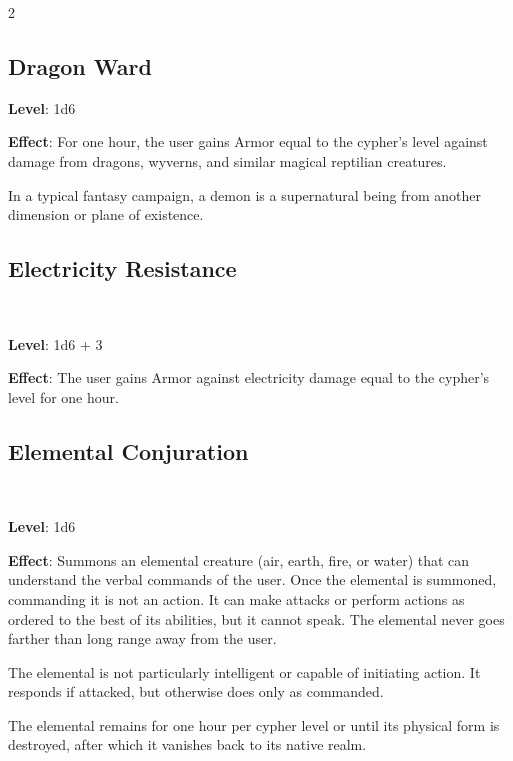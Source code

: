 \begin{multicols}{2}
\subsection{Dragon Ward}

\textbf{Level}: 1d6 

\textbf{Effect}: For one hour, the user gains Armor equal to the cypher’s level against damage from dragons, wyverns, and similar magical reptilian creatures.

In a typical fantasy campaign, a demon is a supernatural being from another dimension or plane of existence.

\subsection{Electricity Resistance} 

\textbf{Level}: 1d6 + 3 

\textbf{Effect}: The user gains Armor against electricity damage equal to the cypher’s level for one hour. 

\subsection{Elemental Conjuration}

\textbf{Level}: 1d6 

\textbf{Effect}: Summons an elemental creature (air, earth, fire, or water) that can understand the verbal commands of the user. Once the elemental is summoned, commanding it is not an action. It can make attacks or perform actions as ordered to the best of its abilities, but it cannot speak. The elemental never goes farther than long range away from the user. 

The elemental is not particularly intelligent or capable of initiating action. It responds if attacked, but otherwise does only as commanded. 

The elemental remains for one hour per cypher level or until its physical form is destroyed, after which it vanishes back to its native realm. 


\end{multicols}
